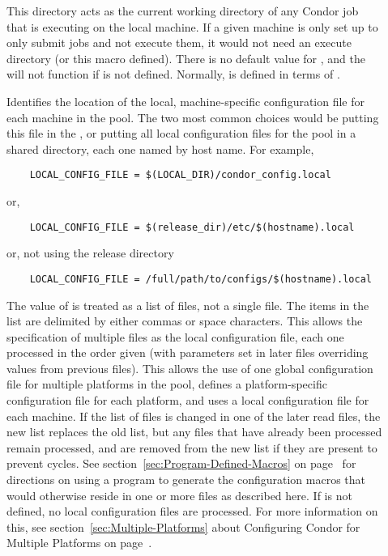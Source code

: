 \begin{description}
\item[] \label{param:Execute} This directory acts as
  the current working directory of any Condor job that is executing on
  the local machine.  If a given machine is only set up to only submit
  jobs and not execute them, it would not need an execute directory
  (or this macro defined).  There is no default value for
  , and the  will not function if
   is not defined.  Normally,  is
  defined in terms of .
  
\item[] \label{param:LocalConfigFile}
  Identifies the
  location of the local, machine-specific configuration
  file for each machine
  in the pool.  The two most common choices would be putting this
  file in the , or putting all
  local configuration files for the pool in a shared directory, each one
  named by host name.  For example,
  \begin{verbatim}
    LOCAL_CONFIG_FILE = $(LOCAL_DIR)/condor_config.local
  \end{verbatim}
  or,
  \begin{verbatim}
    LOCAL_CONFIG_FILE = $(release_dir)/etc/$(hostname).local
  \end{verbatim}
  or, not using the release directory
  \begin{verbatim}
    LOCAL_CONFIG_FILE = /full/path/to/configs/$(hostname).local
  \end{verbatim}
  
  The value of  is treated as a list of files,
  not a
  single file.  The items in the list are delimited by either commas
  or space characters.
  This allows the specification of multiple files as
  the local configuration file, each one processed in the
  order given (with parameters set in later files overriding values
  from previous files).  This allows the use of one global
  configuration file for multiple platforms in the pool, defines a
  platform-specific configuration file for each platform, and uses a
  local configuration file for each machine. 
  If the list of files is changed in one of the later read files, the new list
  replaces the old list, but any files that have already been processed
  remain processed, and are removed from the new list if they are present
  to prevent cycles.
  See section~\ref{sec:Program-Defined-Macros} on 
  page~\pageref{sec:Program-Defined-Macros} for directions on
  using a program to generate the configuration macros that would
  otherwise reside in one or more files as described here.
  If  is not defined, no local configuration
  files are processed.  For more information on this, see
  section~\ref{sec:Multiple-Platforms} about Configuring Condor for
  Multiple Platforms on page~\pageref{sec:Multiple-Platforms}.


\end{description}
